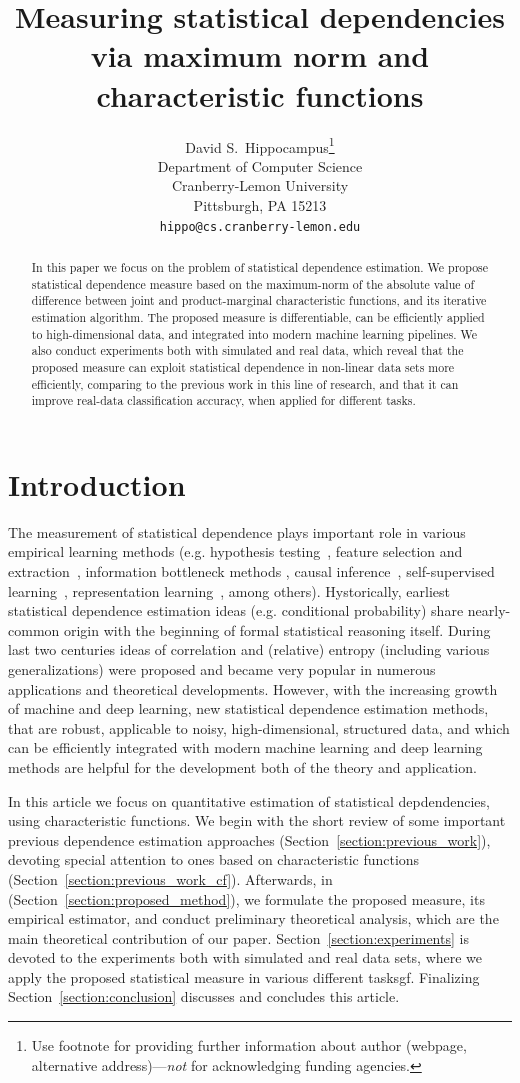 \documentclass{article}
\title{Measuring statistical dependencies via maximum norm and characteristic functions}
\author{%
  David S.~Hippocampus\thanks{Use footnote for providing further information
    about author (webpage, alternative address)---\emph{not} for acknowledging
    funding agencies.} \\
  Department of Computer Science\\
  Cranberry-Lemon University\\
  Pittsburgh, PA 15213 \\
  \texttt{hippo@cs.cranberry-lemon.edu} \\
}
\begin{document}
\maketitle


\begin{abstract}
    In this paper we focus on the problem of statistical dependence estimation. We propose statistical dependence measure based on the maximum-norm of the absolute value of difference between joint and product-marginal characteristic functions, and its iterative estimation algorithm. The proposed measure is differentiable, can be efficiently applied to high-dimensional data, and integrated into modern machine learning pipelines. We also conduct experiments both with simulated and real data, which reveal that the proposed measure can exploit statistical dependence in non-linear data sets more efficiently, comparing to the previous work in this line of research, and that it can improve real-data classification accuracy, when applied for different tasks.
\end{abstract}

\section{Introduction}
The measurement of  statistical dependence plays important role in various empirical learning methods (e.g. hypothesis testing~\cite{Gretton2005MeasuringSD}, feature selection and extraction~\cite{EigenHSIC,HSCA}, information bottleneck methods \cite{Ma2020TheHB}, causal inference~\cite{NIPS2008_f7664060}, self-supervised learning~\cite{li2021selfsupervised}, representation learning~\cite{Ragonesi2021LearningUR}, among others).  Hystorically, earliest statistical dependence estimation ideas (e.g. conditional probability) share nearly-common origin with the beginning of formal statistical reasoning itself. During last two centuries ideas of correlation and (relative) entropy (including various generalizations) were proposed and became very popular in numerous applications and theoretical developments. However, with the increasing growth of machine and deep learning, new statistical dependence estimation methods, that are robust, applicable to noisy, high-dimensional, structured data, and which can be efficiently integrated with modern machine learning and deep learning methods are helpful for the development both of the theory and application.

In this article we focus on quantitative estimation of statistical depdendencies, using characteristic functions. We begin with the short review of some important previous dependence estimation approaches (Section~\ref{section:previous_work}), devoting special attention to ones based on characteristic functions (Section~\ref{section:previous_work_cf}). Afterwards, in (Section~\ref{section:proposed_method}), we formulate the proposed measure, its empirical estimator, and conduct preliminary theoretical analysis, which are the main theoretical contribution of our paper. Section~\ref{section:experiments} is devoted to the experiments both with simulated and real data sets, where we apply the proposed statistical measure in various different tasksgf. Finalizing Section~\ref{section:conclusion} discusses and concludes this article.
\end{document}
